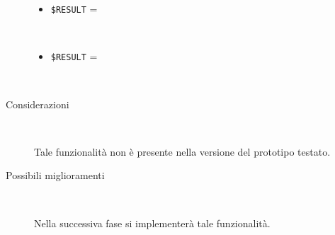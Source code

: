 \documentclass[../../SperimentazioniPratiche.tex]{subfiles}
\begin{document}
\begin{tcolorbox}[fonttitle=\bfseries, 
								adjusted title={\Large Prova 10A.1}, 
								breakable, 
								sharp corners=south,
								colback=white, 
								colframe=white!60!black]
\begin{description}[leftmargin=0.7cm,labelwidth=!]
					\tcbline        				
        				
        			\item[Output riscontrato] \ \par
        				\begin{description}
        				
        					\item[\dispositivoA] \ \par
        					\begin{itemize}
        						\item \verb|$RESULT| = \ns
        					\end{itemize}      					
        					
        					\item[\dispositivoB] \ \par
        					\begin{itemize}
        						\item \verb|$RESULT| = \ns
        					\end{itemize}
        					
        				\end{description}
        				
        			\tcbline
        			
        			\item[Analisi risultati] \ \par
        				\begin{description}
        					\item[Considerazioni] \ \par
        						Tale funzionalità non è presente nella versione del prototipo testato.
        					
        					\item[Possibili miglioramenti] \ \par 
        						Nella successiva fase si implementerà tale funzionalità.
        				\end{description}
        				
				\end{description}  
				
			\end{tcolorbox}



	
	\newpage		
\end{document}
